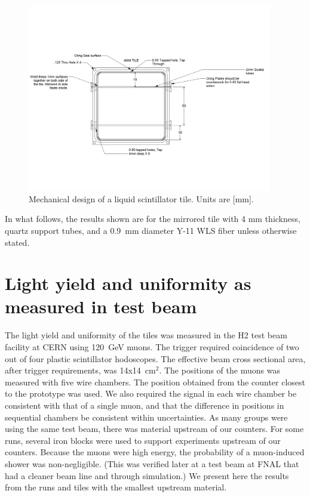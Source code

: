 \documentclass[review]{elsarticle}
\begin{document}
\begin{figure}[!ht]
\begin{center}
\includegraphics[width=0.95\textwidth]{./figures/mechanicaldesign.pdf}
\caption{Mechanical design of a liquid scintillator tile. Units are
  [mm].}
\label{fig:tiledesign}
\end{center}
\end{figure}

In what follows, the results shown are for the mirrored tile with 4 mm
thickness, quartz support tubes, and a 0.9~mm diameter Y-11 WLS fiber
unless otherwise stated.

\section{Light yield and uniformity as measured in test beam}

The light yield and uniformity of the tiles was measured in the H2
test beam facility at CERN using 120~GeV muons. The trigger required
coincidence of two out of four plastic scintillator hodoscopes. The
effective beam cross sectional area, after trigger requirements, was
14x14~cm$^2$. The positions of the muons was measured with five
wire chambers. The position obtained from the counter closest to the
prototype was used. We also required the signal in each wire chamber
be consistent with that of a single muon, and that the difference in
positions in sequential chambers be consistent within uncertainties.
As many groups were using the same test beam, there was material
upstream of our counters. For some runs, several iron blocks were
used to support experiments upstream of our counters. Because the
muons were high energy, the probability of a muon-induced shower was
non-negligible. (This was verified later at a test beam at FNAL that
had a cleaner beam line and through simulation.) We present here the
results from the runs and tiles with the smallest upstream material.
\end{document}
